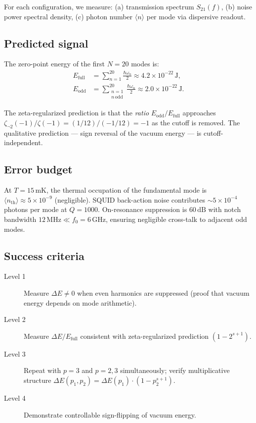 \documentclass[aps,prd,twocolumn,superscriptaddress,nofootinbib]{revtex4-2}
\begin{document}
For each configuration, we measure:
(a) transmission spectrum $S_{21}(f)$,
(b) noise power spectral density,
(c) photon number $\langle n \rangle$ per mode via dispersive readout.

\subsection{Predicted signal}

The zero-point energy of the first $N = 20$ modes is:
\begin{align}
  E_{\mathrm{full}} &= \sum_{n=1}^{20} \frac{\hbar \omega_n}{2} \approx 4.2 \times 10^{-22}\,\mathrm{J}, \\
  E_{\mathrm{odd}} &= \sum_{\substack{n=1 \\ n\,\mathrm{odd}}}^{20} \frac{\hbar \omega_n}{2} \approx 2.0 \times 10^{-22}\,\mathrm{J}.
\end{align}

The zeta-regularized prediction is that the \emph{ratio}
$E_{\mathrm{odd}}/E_{\mathrm{full}}$ approaches
$\zeta_{\neg 2}(-1)/\zeta(-1) = (1/12)/(-1/12) = -1$
as the cutoff is removed. The qualitative prediction ---
sign reversal of the vacuum energy --- is cutoff-independent.

\subsection{Error budget}

At $T = 15\,\mathrm{mK}$, the thermal occupation of the
fundamental mode is $\langle n_{\mathrm{th}} \rangle \approx 5 \times 10^{-9}$
(negligible). SQUID back-action noise contributes
$\sim 5 \times 10^{-4}$ photons per mode at $Q = 1000$.
On-resonance suppression is $60\,\mathrm{dB}$ with notch
bandwidth $12\,\mathrm{MHz} \ll f_0 = 6\,\mathrm{GHz}$,
ensuring negligible cross-talk to adjacent odd modes.

\subsection{Success criteria}

\begin{description}
  \item[Level 1] Measure $\Delta E \neq 0$ when even harmonics
    are suppressed (proof that vacuum energy depends on mode arithmetic).
  \item[Level 2] Measure $\Delta E / E_{\mathrm{full}}$ consistent
    with zeta-regularized prediction $(1 - 2^{s+1})$.
  \item[Level 3] Repeat with $p = 3$ and $p = 2,3$ simultaneously;
    verify multiplicative structure $\Delta E(p_1, p_2) = \Delta E(p_1) \cdot (1 - p_2^{s+1})$.
  \item[Level 4] Demonstrate controllable sign-flipping of vacuum energy.
\end{description}
\end{document}
